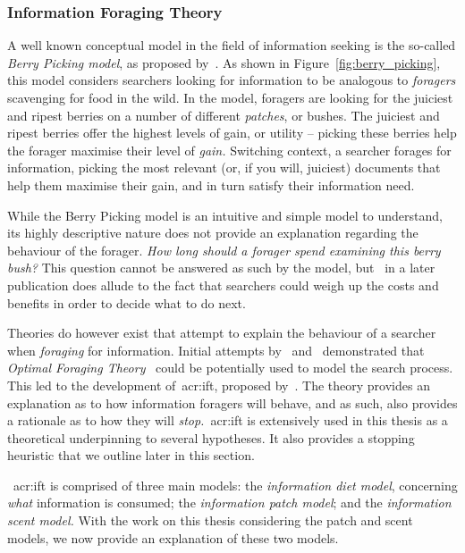 \subsubsection{Information Foraging Theory}\label{sec:stopping_background:models:theoretical:ift}
A well known conceptual model in the field of information seeking is the so-called \emph{Berry Picking model}, as proposed by~\cite{bates1989berry_picking}. As shown in Figure~\ref{fig:berry_picking}, this model considers searchers looking for information to be analogous to \emph{foragers} scavenging for food in the wild. In the model, foragers are looking for the juiciest and ripest berries on a number of different \emph{patches}, or bushes. The juiciest and ripest berries offer the highest levels of gain, or utility -- picking these berries help the forager maximise their level of \emph{gain.} Switching context, a searcher forages for information, picking the most relevant (or, if you will, juiciest) documents that help them maximise their gain, and in turn satisfy their information need.

While the Berry Picking model is an intuitive and simple model to understand, its highly descriptive nature does not provide an explanation regarding the behaviour of the forager. \emph{How long should a forager spend examining this berry bush?} This question cannot be answered as such by the model, but~\cite{bates1989alluding} in a later publication does allude to the fact that searchers could weigh up the costs and benefits in order to decide what to do next.

Theories do however exist that attempt to explain the behaviour of a searcher when \emph{foraging} for information. Initial attempts by~\cite{russell1993sense_making} and~\cite{sandstrom1994optimal_foraging} demonstrated that \emph{Optimal Foraging Theory}~\citep{stephens1986foraging_theory} could be potentially used to model the search process. This led to the development of~\gls{acr:ift}, proposed by~\cite{pirolli1999ift}. The theory provides an explanation as to how information foragers will behave, and as such, also provides a rationale as to how they will \emph{stop.}~\gls{acr:ift} is extensively used in this thesis as a theoretical underpinning to several hypotheses. It also provides a stopping heuristic that we outline later in this section.

\noindent
{}~\gls{acr:ift} is comprised of three main models: the \emph{information diet model}, concerning \emph{what} information is consumed; the \emph{information patch model}; and the \emph{information scent model.} With the work on this thesis considering the patch and scent models, we now provide an explanation of these two models.

